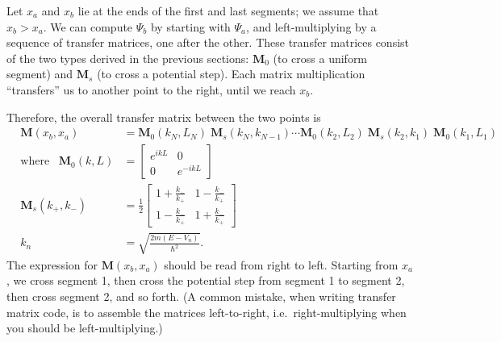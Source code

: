 \documentclass[pra,12pt]{revtex4}
\begin{document}
Let $x_a$ and $x_b$ lie at the ends of the first and last segments; we
assume that $x_b > x_a$.  We can compute $\Psi_b$ by starting with
$\Psi_a$, and left-multiplying by a sequence of transfer matrices, one
after the other.  These transfer matrices consist of the two types
derived in the previous sections: $\mathbf{M}_0$ (to cross a uniform
segment) and $\mathbf{M}_s$ (to cross a potential step).  Each matrix
multiplication ``transfers'' us to another point to the right, until
we reach $x_b$.

Therefore, the overall transfer matrix between the two points is
$$\boxed{\;\;\;\begin{aligned}\mathbf{M}(x_b, x_a) &= \mathbf{M}_0(k_N,L_N) \; \mathbf{M}_s(k_N, k_{N-1}) \cdots \mathbf{M}_0(k_2,L_2) \; \mathbf{M}_s(k_2, k_1) \; \mathbf{M}_0(k_1,L_1) \;\;\;\\ \mathrm{where}\;\;\; \mathbf{M}_0(k,L) &= \begin{bmatrix}e^{ikL} & 0 \\ 0 & e^{-ikL}\end{bmatrix} \\ \mathbf{M}_s(k_+,k_-) &= \frac{1}{2} \begin{bmatrix}1+\frac{k_-}{k_+} & 1-\frac{k_-}{k_+} \\ 1-\frac{k_-}{k_+} & 1+\frac{k_-}{k_+}\end{bmatrix}\\ k_n &= \sqrt{\frac{2m(E-V_n)}{\hbar^2}}.\end{aligned}}$$
The expression for $\mathbf{M}(x_b,x_a)$ should be read from right to
left.  Starting from $x_a$, we cross segment 1, then cross the
potential step from segment 1 to segment 2, then cross segment 2, and
so forth.  (A common mistake, when writing transfer matrix code, is to
assemble the matrices left-to-right, i.e.~right-multiplying when you
should be left-multiplying.)
\end{document}
